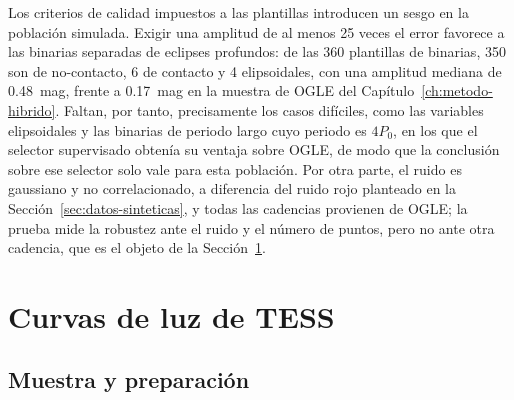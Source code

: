 \documentclass[12pt,letterpaper,oneside]{book}
\begin{document}
Los criterios de calidad impuestos a las plantillas introducen un sesgo en la poblaci\'on simulada. Exigir una amplitud de al menos 25 veces el error favorece a las binarias separadas de eclipses profundos: de las 360 plantillas de binarias, 350 son de no-contacto, 6 de contacto y 4 elipsoidales, con una amplitud mediana de 0.48~mag, frente a 0.17~mag en la muestra de OGLE del Cap\'itulo~\ref{ch:metodo-hibrido}. Faltan, por tanto, precisamente los casos dif\'iciles, como las variables elipsoidales y las binarias de periodo largo cuyo periodo es $4P_0$, en los que el selector supervisado obten\'ia su ventaja sobre OGLE, de modo que la conclusi\'on sobre ese selector solo vale para esta poblaci\'on. Por otra parte, el ruido es gaussiano y no correlacionado, a diferencia del ruido rojo planteado en la Secci\'on~\ref{sec:datos-sinteticas}, y todas las cadencias provienen de OGLE; la prueba mide la robustez ante el ruido y el n\'umero de puntos, pero no ante otra cadencia, que es el objeto de la Secci\'on~\ref{sec:validacion-tess}.

\section{Curvas de luz de TESS}
\label{sec:validacion-tess}

\subsection{Muestra y preparaci\'on}
\end{document}
